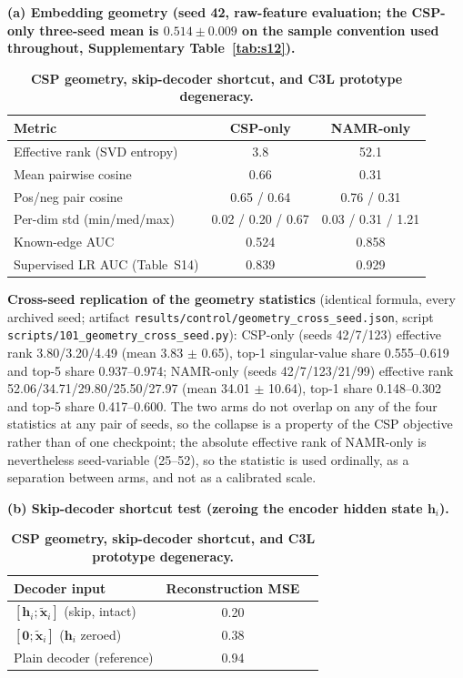 \documentclass[11pt,a4paper]{article}
\newcommand{\supptab}[1]{Supplementary Table~\ref{#1}}
\begin{document}
\begin{table}[h]
\centering
\caption{\textbf{CSP geometry, skip-decoder shortcut, and C3L prototype degeneracy.}}
\label{tab:s20}
\footnotesize
\textbf{(a) Embedding geometry (seed 42, raw-feature evaluation; the CSP-only three-seed mean is $0.514 \pm 0.009$ on the sample convention used throughout, \supptab{tab:s12}).}
\begin{tabular}{@{}>{\raggedright\arraybackslash}p{}cc@{}}
\toprule
\textbf{Metric} & \textbf{CSP-only} & \textbf{NAMR-only} \\
\midrule
Effective rank (SVD entropy) & 3.8 & 52.1 \\
Mean pairwise cosine & 0.66 & 0.31 \\
Pos/neg pair cosine & 0.65 / 0.64 & 0.76 / 0.31 \\
Per-dim std (min/med/max) & 0.02 / 0.20 / 0.67 & 0.03 / 0.31 / 1.21 \\
Known-edge AUC & 0.524 & 0.858 \\
Supervised LR AUC (Table~S14) & 0.839 & 0.929 \\
\bottomrule
\end{tabular}

{\footnotesize \noindent \textbf{Cross-seed replication of the geometry statistics} (identical formula, every archived seed; artifact \texttt{results/control/geometry\_\allowbreak cross\_\allowbreak seed.\allowbreak json}, script \texttt{scripts/101\_\allowbreak geometry\_\allowbreak cross\_\allowbreak seed.\allowbreak py}): CSP-only (seeds 42/7/123) effective rank 3.80/3.20/4.49 (mean 3.83 $\pm$ 0.65), top-1 singular-value share 0.555--0.619 and top-5 share 0.937--0.974; NAMR-only (seeds 42/7/123/21/99) effective rank 52.06/34.71/29.80/25.50/27.97 (mean 34.01 $\pm$ 10.64), top-1 share 0.148--0.302 and top-5 share 0.417--0.600. The two arms do not overlap on any of the four statistics at any pair of seeds, so the collapse is a property of the CSP objective rather than of one checkpoint; the absolute effective rank of NAMR-only is nevertheless seed-variable (25--52), so the statistic is used ordinally, as a separation between arms, and not as a calibrated scale.}

\smallskip
\textbf{(b) Skip-decoder shortcut test (zeroing the encoder hidden state $\mathbf{h}_i$).}
\begin{tabular}{@{}>{\raggedright\arraybackslash}p{}cc@{}}
\toprule
\textbf{Decoder input} & \textbf{Reconstruction MSE} \\
\midrule
$[\mathbf{h}_i;\tilde{\mathbf{x}}_i]$ (skip, intact) & 0.20 \\
$[\mathbf{0};\tilde{\mathbf{x}}_i]$ ($\mathbf{h}_i$ zeroed) & 0.38 \\
Plain decoder (reference) & 0.94 \\
\bottomrule
\end{tabular}


\end{table}
\end{document}
